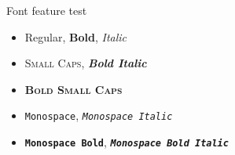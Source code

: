\begin{frame}{Font feature test}
  \begin{itemize}
    \item Regular, \textbf{Bold}, \textit{Italic}
    \item \textsc{Small Caps}, \textbf{\textit{Bold Italic}}
    \item \textbf{\textsc{Bold Small Caps}}
    \item \texttt{Monospace}, \texttt{\textit{Monospace Italic}}
    \item \texttt{\textbf{Monospace Bold}},
        \texttt{\textbf{\textit{Monospace Bold Italic}}}
  \end{itemize}
\end{frame}
